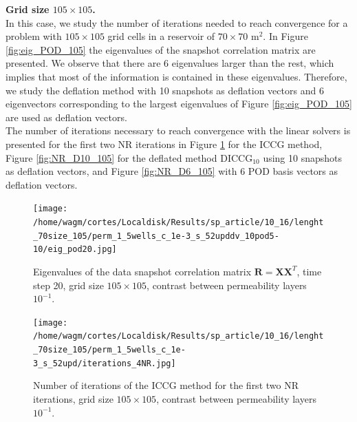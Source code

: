 \documentclass[12pt]{article}
\begin{document}
\textbf{Grid size $105 \times 105 $.}\\
In this case, we study the number of iterations needed to reach convergence for a problem with $105 \times 105$
grid cells in a reservoir of $70\times 70$ m$^2$.
In Figure \ref{fig:eig_POD_105} the eigenvalues of the snapshot correlation matrix are presented. We observe that
there are 6 eigenvalues larger than the rest, which implies that most of the information is contained in these
eigenvalues. Therefore, we study the deflation method with 10 snapshots as deflation vectors and 6 eigenvectors
corresponding to the largest eigenvalues of Figure \ref{fig:eig_POD_105} are used as deflation vectors. \\
 The number of iterations necessary to reach convergence with the linear solvers is presented for the first two
 NR iterations in Figure \ref{fig:NR_IC_105} for the ICCG method, Figure \ref{fig:NR_D10_105} for the deflated
 method DICCG$_{10}$ using 10 snapshots as deflation vectors, and Figure \ref{fig:NR_D6_105} with 6 POD basis
 vectors as deflation vectors.

\begin{figure}[!ht]
\centering
\begin{minipage}{.4\textwidth}
 \centering
\texttt{[image: /home/wagm/cortes/Localdisk/Results/sp\_article/10\_16/lenght\_70size\_105/perm\_1\_5wells\_c\_1e-3\_s\_52upddv\_10pod5-10/eig\_pod20.jpg]}
\caption{Eigenvalues of the data snapshot correlation matrix $\mathbf{R}=\mathbf{X}\mathbf{X}^T$, time step 20, grid size $105\times105$, contrast between permeability layers $10^{-1}$.}
\label{fig:eig_POD_105}
\end{minipage}%
\hspace{15mm}
\begin{minipage}{.4\textwidth}
\hspace{-1cm}
\texttt{[image: /home/wagm/cortes/Localdisk/Results/sp\_article/10\_16/lenght\_70size\_105/perm\_1\_5wells\_c\_1e-3\_s\_52upd/iterations\_4NR.jpg]}
\vspace{-1.3cm}
\caption{Number of iterations of the ICCG method for the first two NR iterations, grid size $105\times 105$, contrast between permeability layers $10^{-1}$.}
\label{fig:NR_IC_105}
\end{minipage}
\end{figure}
\end{document}
